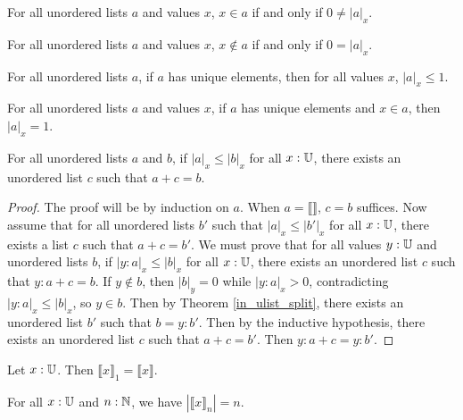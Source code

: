 \documentclass[../../math.tex]{subfiles}
\begin{document}
\begin{theorem} \label{ulist_count_in}
    For all unordered lists $a$ and values $x$, $x \in a$ if and only if $0 \neq
    |a|_x$.
\end{theorem}

\begin{theorem} \label{ulist_count_nin}
    For all unordered lists $a$ and values $x$, $x \notin a$ if and only if $0 =
    |a|_x$.
\end{theorem}

\begin{theorem} \label{ulist_count_unique}
    For all unordered lists $a$, if $a$ has unique elements, then for all values
    $x$, $|a|_x \leq 1$.
\end{theorem}

\begin{theorem} \label{ulist_count_in_unique}
    For all unordered lists $a$ and values $x$, if $a$ has unique elements and
    $x \in a$, then $|a|_x = 1$.
\end{theorem}

\begin{theorem} \label{ulist_count_sub}
    For all unordered lists $a$ and $b$, if $|a|_x \leq |b|_x$ for all $x : \mathbb{U}$,
    there exists an unordered list $c$ such that $a + c = b$.
\end{theorem}
\begin{proof}
    The proof will be by induction on $a$.  When $a = \llbracket \rrbracket$, $c
    = b$ suffices.  Now assume that for all unordered lists $b'$ such that
    $|a|_x \leq |b'|_x$ for all $x : \mathbb{U}$, there exists a list $c$ such that $a +
    c = b'$.  We must prove that for all values $y : \mathbb{U}$ and unordered lists
    $b$, if $|y : a|_x \leq |b|_x$ for all $x : \mathbb{U}$, there exists an unordered
    list $c$ such that $y : a + c = b$.  If $y \notin b$, then $|b|_y = 0$ while
    $|y : a|_x > 0$, contradicting $|y : a|_x \leq |b|_x$, so $y \in b$.  Then
    by Theorem \ref{in_ulist_split}, there exists an unordered list $b'$ such
    that $b = y : b'$.  Then by the inductive hypothesis, there exists an
    unordered list $c$ such that $a + c = b'$.  Then $y : a + c = y : b'$.
\end{proof}

\begin{theorem} \label{ulist_constant_one}
    Let $x : \mathbb{U}$.  Then $\llbracket x \rrbracket_1 = \llbracket x\rrbracket$.
\end{theorem}

\begin{theorem} \label{ulist_count_constant}
    For all $x : \mathbb{U}$ and $n : \mathbb{N}$, we have $|\llbracket x\rrbracket_n| = n$.
\end{theorem}
\end{document}
